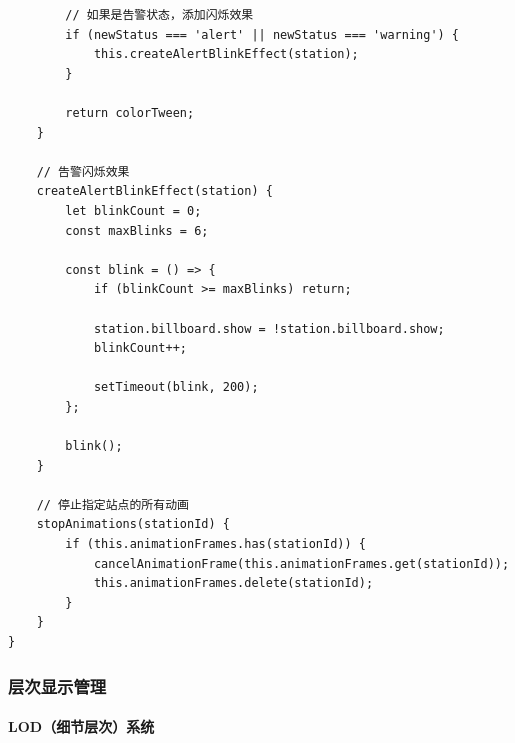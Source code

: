 \begin{lstlisting}
        // 如果是告警状态，添加闪烁效果
        if (newStatus === 'alert' || newStatus === 'warning') {
            this.createAlertBlinkEffect(station);
        }
        
        return colorTween;
    }
    
    // 告警闪烁效果
    createAlertBlinkEffect(station) {
        let blinkCount = 0;
        const maxBlinks = 6;
        
        const blink = () => {
            if (blinkCount >= maxBlinks) return;
            
            station.billboard.show = !station.billboard.show;
            blinkCount++;
            
            setTimeout(blink, 200);
        };
        
        blink();
    }
    
    // 停止指定站点的所有动画
    stopAnimations(stationId) {
        if (this.animationFrames.has(stationId)) {
            cancelAnimationFrame(this.animationFrames.get(stationId));
            this.animationFrames.delete(stationId);
        }
    }
}
\end{lstlisting}

\subsubsection{层次显示管理}\label{ux5c42ux6b21ux663eux793aux7ba1ux7406}

\paragraph{LOD（细节层次）系统}\label{lodux7ec6ux8282ux5c42ux6b21ux7cfbux7edf}

